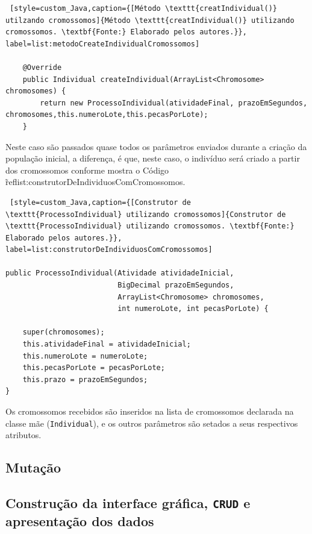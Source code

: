 \begin{lstlisting} [style=custom_Java,caption={[Método \texttt{creatIndividual()} utilzando cromossomos]{Método \texttt{creatIndividual()} utilizando cromossomos. \textbf{Fonte:} Elaborado pelos autores.}}, label=list:metodoCreateIndividualCromossomos] 

	@Override
	public Individual createIndividual(ArrayList<Chromosome> chromosomes) {
		return new ProcessoIndividual(atividadeFinal, prazoEmSegundos, chromosomes,this.numeroLote,this.pecasPorLote);
	}

\end{lstlisting}

\par Neste caso são passados quase todos os parâmetros enviados durante a criação
da população inicial, a diferença, é que, neste caso, o indivíduo será criado a partir 
dos cromossomos conforme mostra o Código \~ref{list:construtorDeIndividuosComCromossomos}.


\begin{lstlisting} [style=custom_Java,caption={[Construtor de \texttt{ProcessoIndividual} utilizando cromossomos]{Construtor de \texttt{ProcessoIndividual} utilizando cromossomos. \textbf{Fonte:} Elaborado pelos autores.}}, label=list:construtorDeIndividuosComCromossomos] 

public ProcessoIndividual(Atividade atividadeInicial, 
						  BigDecimal prazoEmSegundos, 
						  ArrayList<Chromosome> chromosomes, 
						  int numeroLote, int pecasPorLote) {

	super(chromosomes);
	this.atividadeFinal = atividadeInicial;
	this.numeroLote = numeroLote;
	this.pecasPorLote = pecasPorLote;
	this.prazo = prazoEmSegundos;
}

\end{lstlisting}

\par Os cromossomos recebidos são inseridos na lista de cromossomos declarada na classe mãe (\texttt{Individual}), e os 
outros parâmetros são setados a seus respectivos atributos.

\subsection{Mutação}

 
\subsection{Construção da interface gráfica, \texttt{CRUD} e apresentação dos dados} 




